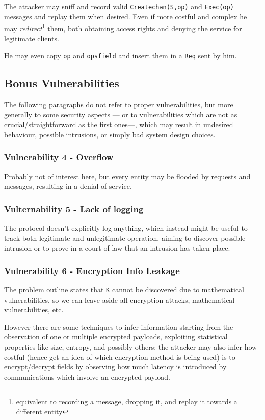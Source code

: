The attacker may sniff and record valid \texttt{Createchan(S,op)} and \texttt{Exec(op)} messages and replay them when desired.
Even if more costful and complex he may \textit{redirect}\footnote{equivalent to recording a message, dropping it, and replay it towards a different entity} them,
both obtaining access rights and denying the service for legitimate clients.

He may even copy \texttt{op} and \texttt{opsfield} and insert them in a \texttt{Req} sent by him.

\subsection{Bonus Vulnerabilities}
The following paragraphs do not refer to proper vulnerabilities,
but more generally to some security aspects  {---} or to vulnerabilities which are not as crucial/straightforward as the first ones{---}, which may result in undesired behaviour, possible intrusions, or simply bad system design choices.

\subsubsection{Vulnerability 4 - Overflow}
Probably not of interest here,
but every entity may be flooded by requests and messages,
resulting in a denial of service.

\subsubsection{Vulternability 5 - Lack of logging}
The protocol doesn't explicitly log anything,
which instead might be useful to track both legitimate and unlegitimate operation,
aiming to discover possible intrusion or to prove in a court of law that an intrusion has taken place.

\subsubsection{Vulnerability 6 - Encryption Info Leakage}
The problem outline states that \texttt{K} cannot be discovered due to mathematical vulnerabilities,
so we can leave aside all encryption attacks, mathematical vulnerabilities, etc.

However there are some techniques to infer information starting from the observation of one or multiple encrypted payloads,
exploiting statistical properties like size, entropy, and possibly others;
the attacker may also infer how costful (hence get an idea of which encryption method is being used) is to encrypt/decrypt fields by observing how much latency is introduced by communications which involve an encrypted payload.

